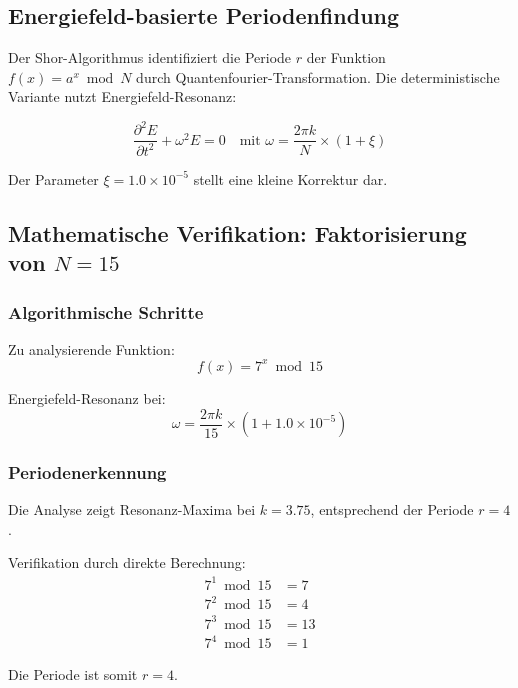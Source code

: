\documentclass[12pt,a4paper]{report}
\begin{document}
	\subsection{Energiefeld-basierte Periodenfindung}
	
	Der Shor-Algorithmus identifiziert die Periode $r$ der Funktion $f(x) = a^x \bmod N$ durch Quantenfourier-Transformation. Die deterministische Variante nutzt Energiefeld-Resonanz:
	
	\begin{equation}
		\frac{\partial^2 E}{\partial t^2} + \omega^2 E = 0 \quad \text{mit } \omega = \frac{2\pi k}{N} \times (1 + \xi)
	\end{equation}
	
	Der Parameter $\xi = 1.0 \times 10^{-5}$ stellt eine kleine Korrektur dar.
	
	\subsection{Mathematische Verifikation: Faktorisierung von $N = 15$}
	
	\subsubsection{Algorithmische Schritte}
	
	Zu analysierende Funktion:
	\begin{equation}
		f(x) = 7^x \bmod 15
	\end{equation}
	
	Energiefeld-Resonanz bei:
	\begin{equation}
		\omega = \frac{2\pi k}{15} \times (1 + 1.0 \times 10^{-5})
	\end{equation}
	
	\subsubsection{Periodenerkennung}
	
	Die Analyse zeigt Resonanz-Maxima bei $k = 3.75$, entsprechend der Periode $r = 4$.
	
	Verifikation durch direkte Berechnung:
	\begin{align}
		7^1 \bmod 15 &= 7 \\
		7^2 \bmod 15 &= 4 \\
		7^3 \bmod 15 &= 13 \\
		7^4 \bmod 15 &= 1
	\end{align}
	
	Die Periode ist somit $r = 4$.
	
\end{document}
